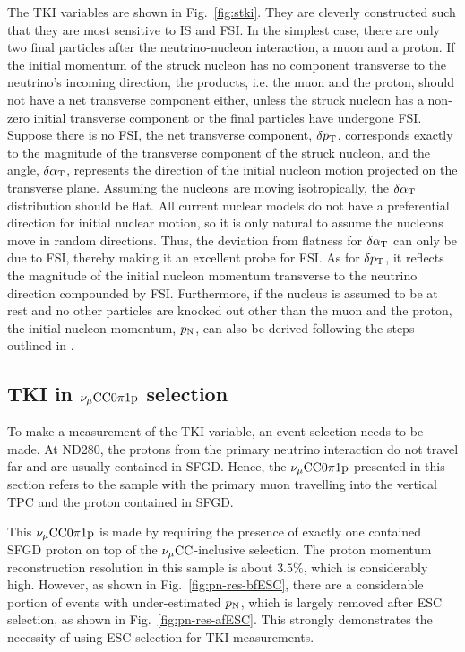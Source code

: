        The TKI variables are shown in Fig.~\ref{fig:stki}. They are cleverly constructed such that they are most sensitive to IS and FSI. 
       In the simplest case, there are only two final particles after the neutrino-nucleon interaction, a muon and a proton. 
       If the initial momentum of the struck nucleon has no component transverse to the neutrino's incoming direction, the products, i.e. the muon and the proton, should not have a net transverse component either, unless the struck nucleon has a non-zero initial transverse component or the final particles have undergone FSI.
       Suppose there is no FSI, the net transverse component, $\delta p_\textrm{T}$, corresponds exactly to the magnitude of the transverse component of the struck nucleon, and the angle, $\delta\alpha_\textrm{T}$, represents the direction of the initial nucleon motion projected on the transverse plane. 
       Assuming the nucleons are moving isotropically, the $\delta\alpha_\textrm{T}$ distribution should be flat. 
       All current nuclear models do not have a preferential direction for initial nuclear motion, so it is only natural to assume the nucleons move in random directions. 
       Thus, the deviation from flatness for $\delta\alpha_\textrm{T}$ can only be due to FSI, thereby making it an excellent probe for FSI. 
       As for $\delta p_\textrm{T}$, it reflects the magnitude of the initial nucleon momentum transverse to the neutrino direction compounded by FSI. 
       Furthermore, if the nucleus is assumed to be at rest and no other particles are knocked out other than the muon and the proton, the initial nucleon momentum, $p_\textrm{N}$, can also be derived following the steps outlined in \cite{pnpaper}. 
    

    \subsection{TKI in $\nu_{\mu}\textrm{CC}0\pi1\textrm{p}$ selection}
    
        To make a measurement of the TKI variable, an event selection needs to be made.
        At ND280, the protons from the primary neutrino interaction do not travel far and are usually contained in SFGD. 
        Hence, the $\nu_{\mu}\textrm{CC}0\pi1\textrm{p}$ presented in this section refers to the sample with the primary muon travelling into the vertical TPC and the proton contained in SFGD. 
        
        This $\nu_{\mu}\textrm{CC}0\pi1\textrm{p}$ is made by requiring the presence of exactly one contained SFGD proton on top of the $\nu_{\mu}\textrm{CC}$-inclusive selection. 
        The proton momentum reconstruction resolution in this sample is about $3.5\%$, which is considerably high. 
        However, as shown in Fig.~\ref{fig:pn-res-bfESC}, there are a considerable portion of events with under-estimated $p_\textrm{N}$, which is largely removed after ESC selection, as shown in Fig.~\ref{fig:pn-res-afESC}.
        This strongly demonstrates the necessity of using ESC selection for TKI measurements.

